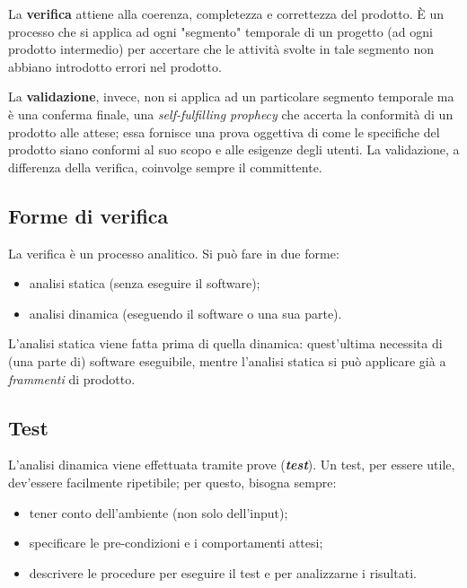 \documentclass[a4paper]{article}
\begin{document}
		
La \textbf{verifica} attiene alla coerenza, completezza e correttezza del prodotto. È un processo che si applica ad ogni "segmento" temporale di un progetto (ad ogni prodotto intermedio) per accertare che le attività svolte in tale segmento non abbiano introdotto errori nel prodotto.
		
La \textbf{validazione}, invece, non si applica ad un particolare segmento temporale ma è una conferma finale, una \emph{self-fulfilling prophecy} che accerta la conformità di un prodotto alle attese; essa fornisce una prova oggettiva di come le specifiche del prodotto siano conformi al suo scopo e alle esigenze degli utenti. La validazione, a differenza della verifica, coinvolge sempre il committente.

		
	\subsection{Forme di verifica}

		
La verifica è un processo analitico. Si può fare in due forme:
		
	\begin{itemize}
		
			
	\item analisi statica (senza eseguire il software);
			
	\item analisi dinamica (eseguendo il software o una sua parte).
		
	\end{itemize}

		
L'analisi statica viene fatta prima di quella dinamica: quest'ultima necessita di (una parte di) software eseguibile, mentre l'analisi statica si può applicare già a \emph{frammenti} di prodotto.

		
	\subsection{Test}

		
L'analisi dinamica viene effettuata tramite prove (\emph{\textbf{test}}). Un test, per essere utile, dev'essere facilmente ripetibile; per questo, bisogna sempre:
		
	\begin{itemize}
		
			
	\item tener conto dell'ambiente (non solo dell'input);
			
	\item specificare le pre-condizioni e i comportamenti attesi;
			
	\item descrivere le procedure per eseguire il test e per analizzarne i risultati.
		
	\end{itemize}
\end{document}
